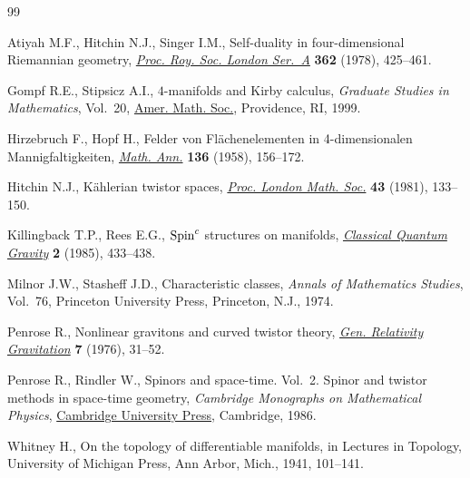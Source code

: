 \documentclass[pdftex]{sigma}
\numberwithin{equation}{section}
\begin{document}
\begin{thebibliography}{99}
\footnotesize\itemsep=-1pt

Atiyah M.F., Hitchin N.J., Singer I.M., Self-duality in four-dimensional
 {R}iemannian geometry, \href{https://doi.org/10.1098/rspa.1978.0143}{\textit{Proc. Roy. Soc. London Ser.~A}} \textbf{362}
 (1978), 425--461.

Gompf R.E., Stipsicz A.I., {$4$}-manifolds and {K}irby calculus,
 \textit{Graduate Studies in Mathematics}, Vol.~20, \href{https://doi.org/10.1090/gsm/020}{Amer. Math.
 Soc.}, Providence, RI, 1999.

Hirzebruch F., Hopf H., Felder von {F}l\"achenelementen in 4-dimensionalen
 {M}annigfaltigkeiten, \href{https://doi.org/10.1007/BF01362296}{\textit{Math. Ann.}} \textbf{136} (1958), 156--172.

Hitchin N.J., K\"ahlerian twistor spaces, \href{https://doi.org/10.1112/plms/s3-43.1.133}{\textit{Proc. London Math. Soc.}}
 \textbf{43} (1981), 133--150.

Killingback T.P., Rees E.G., {${\rm Spin}^c$} structures on manifolds,
 \href{https://doi.org/10.1088/0264-9381/2/4/008}{\textit{Classical Quantum Gravity}} \textbf{2} (1985), 433--438.

Milnor J.W., Stasheff J.D., Characteristic classes, \textit{Annals of
 Mathematics Studies}, Vol.~76, Princeton University Press, Princeton, N.J.,
 1974.

Penrose R., Nonlinear gravitons and curved twistor theory, \href{https://doi.org/10.1007/bf00762011}{\textit{Gen.
 Relativity Gravitation}} \textbf{7} (1976), 31--52.

Penrose R., Rindler W., Spinors and space-time. {V}ol.~2. Spinor and twistor
 methods in space-time geometry, \textit{Cambridge Monographs on Mathematical Physics},
 \href{https://doi.org/10.1017/CBO9780511524486}{Cambridge University Press}, Cambridge, 1986.

Whitney H., On the topology of differentiable manifolds, in Lectures in
 {T}opology, University of Michigan Press, Ann Arbor, Mich., 1941, 101--141.\LastPageEnding

\end{thebibliography}
\end{document}
